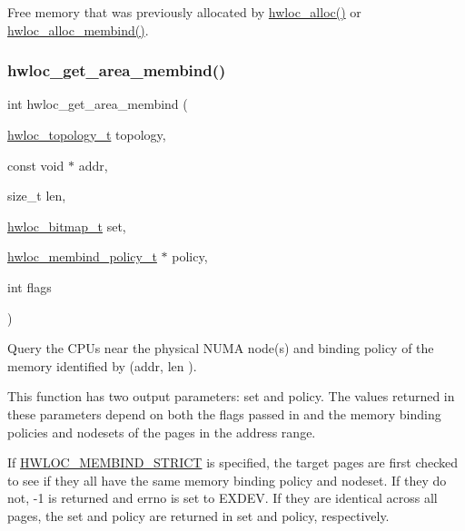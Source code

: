 Free memory that was previously allocated by \hyperlink{a00191_ga972b335a86a7d5e7b34bce2b243c41bc}{hwloc\+\_\+alloc()} or \hyperlink{a00191_ga04736461780fadcf193af218c0122273}{hwloc\+\_\+alloc\+\_\+membind()}. 

\mbox{\label{a00191_gaa87e0a6946ff145914fdf0b1c60567f8}} 
\subsubsection{\texorpdfstring{hwloc\+\_\+get\+\_\+area\+\_\+membind()}{hwloc\_get\_area\_membind()}}
{\footnotesize\ttfamily int hwloc\+\_\+get\+\_\+area\+\_\+membind (\begin{DoxyParamCaption}\item[{\hyperlink{a00186_ga9d1e76ee15a7dee158b786c30b6a6e38}{hwloc\+\_\+topology\+\_\+t}}]{topology,  }\item[{const void $\ast$}]{addr,  }\item[{size\+\_\+t}]{len,  }\item[{\hyperlink{a00205_gaa3c2bf4c776d603dcebbb61b0c923d84}{hwloc\+\_\+bitmap\+\_\+t}}]{set,  }\item[{\hyperlink{a00191_gac9764f79505775d06407b40f5e4661e8}{hwloc\+\_\+membind\+\_\+policy\+\_\+t} $\ast$}]{policy,  }\item[{int}]{flags }\end{DoxyParamCaption})}



Query the C\+P\+Us near the physical N\+U\+MA node(s) and binding policy of the memory identified by ({\ttfamily addr}, {\ttfamily len} ). 

This function has two output parameters\+: {\ttfamily set} and {\ttfamily policy}. The values returned in these parameters depend on both the {\ttfamily flags} passed in and the memory binding policies and nodesets of the pages in the address range.

If \hyperlink{a00191_ggab00475fd98815bf4fb9aaf752030e7d2a0335311a0ee04166df2888d52b4a42c6}{H\+W\+L\+O\+C\+\_\+\+M\+E\+M\+B\+I\+N\+D\+\_\+\+S\+T\+R\+I\+CT} is specified, the target pages are first checked to see if they all have the same memory binding policy and nodeset. If they do not, -\/1 is returned and errno is set to E\+X\+D\+EV. If they are identical across all pages, the set and policy are returned in {\ttfamily set} and {\ttfamily policy}, respectively.

